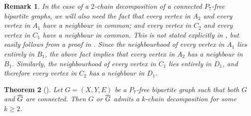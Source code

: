 \documentclass{article}
\newtheorem{theorem}{Theorem}\newtheorem{lemma}[theorem]{Lemma}\newtheorem{proposition}[theorem]{Proposition}\newtheorem{corollary}[theorem]{Corollary}\newtheorem{definition}[theorem]{Definition}\newtheorem{claim}[theorem]{Claim}\newtheorem{remark}[theorem]{Remark}\newtheorem{observation}[theorem]{Observation}\newtheorem{conjecture}[theorem]{Conjecture}\newtheorem{example}[theorem]{Example}
\newcommand\doverline[1]{%
  \setbox0=\hbox{$\!\overline{#1}\!$}%
  \ht0=\dimexpr\ht0-.2ex\relax%
  \,\overline{\copy0}\,%
}
\newcommand{\bc}[1]{\doverline{#1}} %
\begin{document}
\begin{remark}
\label{rem:2-chain decomp}
In the case of a $2$-chain decomposition of a connected $P_7$-free bipartite graphs, we will also
need the fact that every vertex in $A_2$ and every vertex in $A_1$ have a neighbour in common; and
every vertex in $C_2$ and every vertex in $C_1$ have a neighbour in common. This is not stated
explicitly in \cite{LZ17}, but easily follows from a proof in \cite{LZ17}.
Since the neighbourhood of every vertex in $A_1$ lies entirely in $B_1$, the above fact implies
that every vertex in $A_2$ has a neighbour in $B_1$. Similarly, the neighbourhood of every vertex in
$C_1$ lies entirely in $D_1$, and therefore every vertex in $C_2$ has a neighbour in $D_1$.
\end{remark}


\begin{theorem}[\cite{LZ17}]\label{thm:P7_chain_dec}
	Let $G=(X,Y,E)$ be a $P_7$-free bipartite graph such that both $G$ and $\bc{G}$ are connected.
	Then $G$ or $\bc{G}$ admits a $k$-chain decomposition for some $k \geq 2$. 
\end{theorem}
\end{document}
